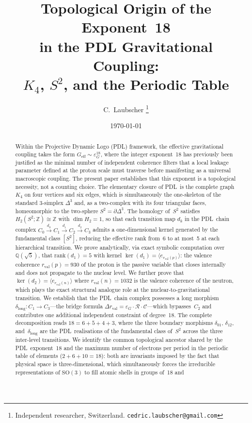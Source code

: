 \documentclass[11pt,a4paper]{article}
\theoremstyle{definition}
\newcommand{\PDL}{\textnormal{PDL}}
\newcommand{\rval}{r_{\mathrm{val}}}
\newcommand{\epsg}{\varepsilon_G}
\newcommand{\Kfour}{K_4}
\newcommand{\Sfour}{\partial\Delta^3}
\newcommand{\Hk}[1]{H_{#1}}
\newcommand{\rank}{\mathrm{rank}}
\newcommand{\dmap}[1]{d_{#1}}
\newcommand{\dlong}{\delta_{\mathrm{long}}}
\newcommand{\calR}{\mathcal{R}}
\newcommand{\calC}{\mathcal{C}}
\begin{document}
\title{%
  Topological Origin of the Exponent~18\\
  in the PDL Gravitational Coupling:\\
  $K_4$, $S^2$, and the Periodic Table%
}
\author{%
  C.~Laubscher%
  \thanks{Independent researcher, Switzerland.
    \texttt{cedric.laubscher@gmail.com}}\\[4pt]%
}
\date{\small \today}
\maketitle
\begin{abstract}
Within the Projective Dynamic Logo (\PDL) framework, the effective gravitational coupling takes the form $G_{\mathrm{eff}} \sim \epsg^{18}$, where the integer exponent~18 has previously been justified as the minimal number of independent coherence filters that a local leakage parameter defined at the proton scale must traverse before manifesting as a universal macroscopic coupling.\cite{Exponent_18_PDL_2026} The present paper establishes that this exponent is a topological necessity, not a counting choice. The elementary closure of \PDL\ is the complete graph $\Kfour$ on four vertices and six edges, which is simultaneously the one-skeleton of the standard $3$-simplex $\Delta^3$ and, as a two-complex with its four triangular faces, homeomorphic to the two-sphere $S^2 = \Sfour$. The homology of~$S^2$ satisfies $\Hk{2}(S^2;\mathbb{Z}) \cong \mathbb{Z}$ with $\dim\Hk{2} = 1$, so that each transition map $\dmap{k}$ in the \PDL\ chain complex $C_0 \xrightarrow{\dmap{0}} C_1 \xrightarrow{\dmap{1}} C_2 \xrightarrow{\dmap{2}} C_3$ admits a one-dimensional kernel generated by the fundamental class $[S^2]$, reducing the effective rank from~6 to at most~5 at each hierarchical transition. We prove analytically, via exact symbolic computation over $\mathbb{Q}(\sqrt{5})$, that $\rank(\dmap{1}) = 5$ with kernel $\ker(\dmap{1}) = \langle e_{\rval(p)}\rangle$: the valence coherence $\rval(p) = 930$ of the proton is the passive variable that closes internally and does not propagate to the nuclear level. We further prove that $\ker(\dmap{2}) = \langle e_{\rval(n)}\rangle$ where $\rval(n) = 1032$ is the valence coherence of the neutron, which plays the exact structural analogue role at the nuclear-to-gravitational transition. We establish that the \PDL\ chain complex possesses a long morphism $\dlong : C_1 \to C_3$---the bridge formula $\Delta\rval = \epsg \cdot \calR \cdot \calC$---which bypasses~$C_2$ and contributes one additional independent constraint of degree~18. The complete decomposition reads $18 = 6 + 5 + 4 + 3$, where the three boundary morphisms $\delta_{01}$, $\delta_{12}$, and~$\dlong$ are the \PDL\ realisations of the fundamental class of~$S^2$ across the three inter-level transitions. We identify the common topological ancestor shared by the \PDL\ exponent~18 and the maximum number of electrons per period in the periodic table of elements ($2+6+10 = 18$): both are invariants imposed by the fact that physical space is three-dimensional, which simultaneously forces the irreducible representations of $\mathrm{SO}(3)$ to fill atomic shells in groups of~18 and 
\end{abstract}
\end{document}
